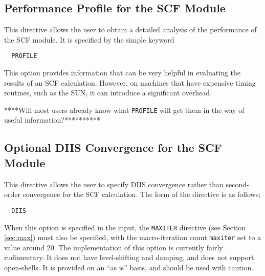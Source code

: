 
\subsection{Performance Profile for the SCF Module}

This directive allows the user to obtain a detailed analysis of the 
performance of the SCF module.  It is specified by the simple keyword

\begin{verbatim}
  PROFILE
\end{verbatim}

This option provides information that can be very helpful
in evaluating the results of an SCF calculation.  However, on machines
that have expensive timing routines, such as the SUN, it can introduce
a significant overhead.

\Large
****Will most users already know what \verb+PROFILE+ will get them in the
way of useful information?**********
\normalsize


\subsection{Optional DIIS Convergence for the SCF Module}

This directive allows the user to specify DIIS convergence rather than
second-order convergence for the SCF calculation.  The form of the
directive is as follows;

\begin{verbatim}
  DIIS
\end{verbatim}

When this option is specified in the input, the \verb+MAXITER+ directive
(see Section \ref{sec:max}) must also be specified, with the macro-iteration
count \verb+maxiter+ set to a value around 20.
The implementation of this option is currently fairly rudimentary.  It
does not have level-shifting and damping, and does not support open-shells.
It is provided on an ``as is'' basis, and should be used with caution.


